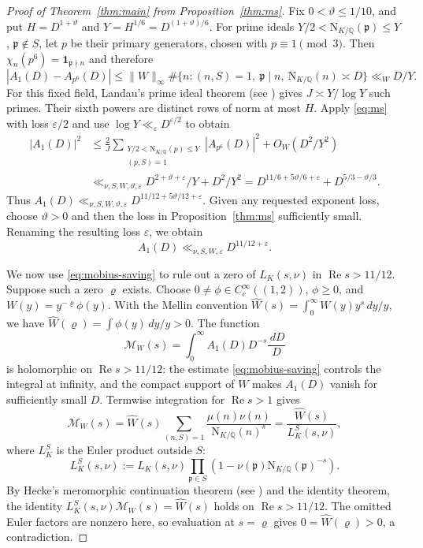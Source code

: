 \documentclass[11pt,a4paper]{article}
\numberwithin{equation}{section}
\numberwithin{figure}{section}
\theoremstyle{definition}
\theoremstyle{remark}
\newcommand{\Q}{\mathbb Q}
\newcommand{\NK}{\mathrm N_{K/\Q}}
\newcommand{\ind}{\mathbf1}
\newcommand{\Rea}{\operatorname{Re}}
\newcommand{\dd}{\,d}
\begin{document}
\begin{proof}[Proof of Theorem~\ref{thm:main} from Proposition~\ref{thm:ms}]
Fix $0<\vartheta\le1/10$, and put $H=D^{1+\vartheta}$ and
$Y=H^{1/6}=D^{(1+\vartheta)/6}$. For prime ideals
$Y/2<\NK(\mathfrak p)\le Y$, $\mathfrak p\notin S$, let $p$ be their
primary generators, chosen with $p\equiv1\pmod3$. Then
$\chi_n(p^6)=\ind_{\mathfrak p\nmid n}$ and therefore
\[
 |A_1(D)-A_{p^6}(D)|
 \le\|W\|_\infty
       \#\{n:(n,S)=1,\ \mathfrak p\mid n,\ \NK(n)\asymp D\}
 \ll_W D/Y.
\]
For this fixed field, Landau's prime ideal theorem \cite{Lan03}
(see \cite[Theorem~5.33]{IK04}) gives
$J\asymp Y/\log Y$ such primes. Their sixth powers are
distinct rows of norm at most $H$. Apply \eqref{eq:ms} with loss
$\varepsilon/2$ and use $\log Y\ll_\varepsilon D^{\varepsilon/2}$ to obtain
\begin{align}
 |A_1(D)|^2
 &\le \frac2J\sum_{\substack{Y/2<\NK(p)\le Y\\(p,S)=1}}|A_{p^6}(D)|^2+O_W(D^2/Y^2)\nonumber\\
 &\ll_{\nu,S,W,\vartheta,\varepsilon}D^{2+\vartheta+\varepsilon}/Y+D^2/Y^2
   =D^{11/6+5\vartheta/6+\varepsilon}+D^{5/3-\vartheta/3}.
                                                        \label{eq:prime-extract}
\end{align}
Thus $A_1(D)\ll_{\nu,S,W,\vartheta,\varepsilon}
D^{11/12+5\vartheta/12+\varepsilon}$. Given any requested exponent loss,
choose $\vartheta>0$ and then the loss in Proposition~\ref{thm:ms}
sufficiently small. Renaming the resulting loss $\varepsilon$, we obtain
\begin{equation}\label{eq:mobius-saving}
                 A_1(D)\ll_{\nu,S,W,\varepsilon}D^{11/12+\varepsilon}.
\end{equation}

We now use
\eqref{eq:mobius-saving} to rule out a zero of $L_K(s,\nu)$ in
$\Rea s>11/12$. Suppose such a zero $\varrho$ exists.
Choose $0\ne\phi\in C_c^\infty((1,2))$, $\phi\ge0$, and
$W(y)=y^{-\varrho}\phi(y)$.
With the Mellin convention
$\widehat W(s)=\int_0^\infty W(y)y^s\dd y/y$, we have
$\widehat W(\varrho)=\int\phi(y)\dd y/y>0$.
The function
\[
 \mathcal M_W(s)=\int_0^\infty A_1(D)D^{-s}\frac{\dd D}{D}
\]
is holomorphic on $\Rea s>11/12$: the estimate
\eqref{eq:mobius-saving} controls the integral at infinity, and
the compact support of $W$ makes $A_1(D)$ vanish for sufficiently
small $D$. Termwise integration for $\Rea s>1$ gives
\[
 \mathcal M_W(s)
 =\widehat W(s)\sum_{(n,S)=1}\frac{\mu(n)\nu(n)}{\NK(n)^s}
 =\frac{\widehat W(s)}{L_K^S(s,\nu)},
\]
where $L_K^S$ is the Euler product outside $S$:
\[
 L_K^S(s,\nu):=L_K(s,\nu)
 \prod_{\mathfrak p\in S}(1-\nu(\mathfrak p)\NK(\mathfrak p)^{-s}).
\]
By Hecke's meromorphic continuation theorem \cite{Hec20}
(see \cite[\S5.10]{IK04}) and the identity theorem, the identity
$L_K^S(s,\nu)\mathcal M_W(s)=\widehat W(s)$ holds on
$\Rea s>11/12$.
The omitted Euler factors are nonzero here, so evaluation at
$s=\varrho$ gives $0=\widehat W(\varrho)>0$, a contradiction.


\end{proof}
\end{document}
